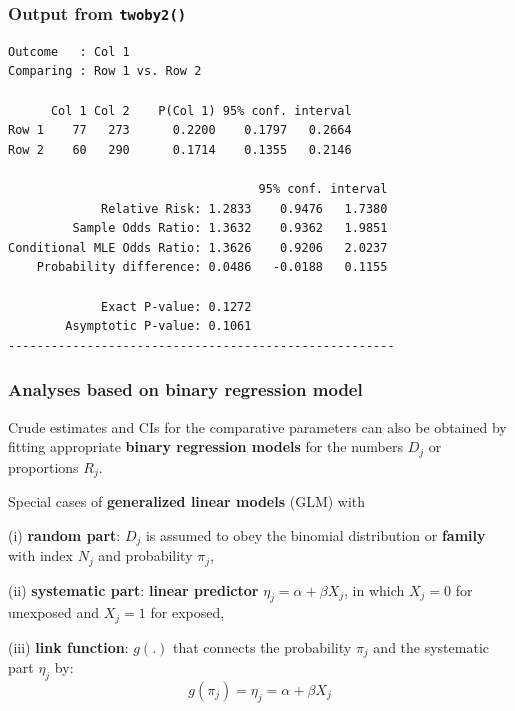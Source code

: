 \documentclass[handout,12pt]{beamer}
\begin{document}
\begin{frame}[fragile] 
\frametitle{Output from {\tt twoby2()}}
\small

\begin{verbatim}
Outcome   : Col 1 
Comparing : Row 1 vs. Row 2 

      Col 1 Col 2    P(Col 1) 95% conf. interval
Row 1    77   273      0.2200    0.1797   0.2664
Row 2    60   290      0.1714    0.1355   0.2146

                                   95% conf. interval
             Relative Risk: 1.2833    0.9476   1.7380
         Sample Odds Ratio: 1.3632    0.9362   1.9851
Conditional MLE Odds Ratio: 1.3626    0.9206   2.0237
    Probability difference: 0.0486   -0.0188   0.1155

             Exact P-value: 0.1272 
        Asymptotic P-value: 0.1061 
------------------------------------------------------
\end{verbatim}
\normalsize
\end{frame}


\begin{frame}[fragile] 
\frametitle{Analyses based on binary regression model}

Crude estimates and CIs for the comparative parameters can also be obtained by fitting appropriate {\bf binary regression models} for the numbers $D_j$ or proportions $R_j$.

Special cases of {\bf generalized linear models} (GLM) with
\bi
\item[(i)] {\bf random part}: $D_j$ is assumed to obey the binomial distribution or {\bf family} with index $N_j$ and probability $\pi_j$, \medskip
\item[(ii)] {\bf systematic part}: {\bf linear predictor} $\eta_j = \alpha + \beta X_j$, in which $X_j = 0$ for unexposed and $X_j = 1$ for exposed, \medskip
\item[(iii)] {\bf link function}: $g(.)$ that connects the probability $\pi_j$ and the systematic part $\eta_j$ by: $$g(\pi_j) = \eta_j = \alpha + \beta X_j$$
\ei
\end{frame}

\end{document}
